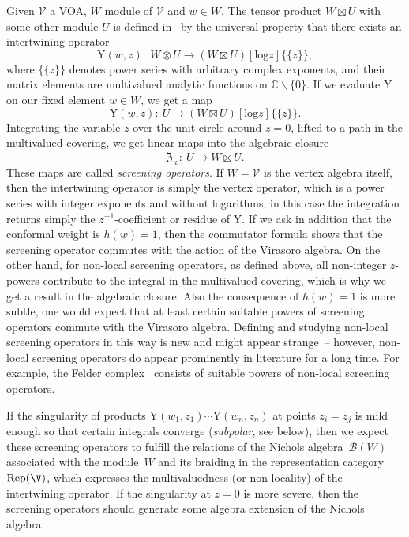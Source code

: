 \documentclass[10pt,a4paper]{amsart}
\numberwithin{equation}{section}
\newcommand{\C}{\mathbb{C}}
\newcommand{\Y}{\mathrm{Y}}
\newcommand{\cB}{\mathcal{B}}
\begin{document}
Given $\mathcal{V}$ a VOA, $W$ module of $\mathcal{V}$ and $w \in W$. The tensor product $W\boxtimes U$ with some other module $U$ is defined in~\cite{HLZ06} by the universal property that there exists an intertwining operator
\[\Y(w, z)\colon \ W\otimes U \rightarrow (W \boxtimes U)[\mathrm{log} z]\{\{z\}\},\]
where $\{\{z\}\}$ denotes power series with arbitrary complex exponents, and their matrix elements are multivalued analytic functions on $\C\backslash\{0\}$. If we evaluate $\Y$ on our fixed element $w\in W$, we get a map
\[\Y(w, z)\colon \ U \rightarrow (W \boxtimes U)[\mathrm{log} z]\{\{z\}\}.\]
	Integrating the variable $z$ over the unit circle around $z=0$, lifted to a path in the multivalued covering, we get linear maps into the algebraic closure
	\[\mathfrak{Z}_w \colon \  U \rightarrow \overline{W \boxtimes U}.\]
	These maps are called \emph{screening operators}. If $W=\mathcal{V}$ is the vertex algebra itself, then the intertwining operator is simply the vertex operator, which is a power series with integer exponents and without logarithms; in this case the integration returns simply the $z^{-1}$-coefficient or residue of $\Y$. If we ask in addition that the conformal weight is $h(w)=1$, then the commutator formula shows that the screening operator commutes with the action of the Virasoro algebra. On the other hand, for non-local screening operators, as defined above, all non-integer $z$-powers contribute to the integral in the multivalued covering, which is why we get a result in the algebraic closure. Also the consequence of $h(w)=1$ is more subtle, one would expect that at least certain suitable powers of screening operators commute with the Virasoro algebra. Defining and studying non-local screening operators in this way is new and might appear strange~-- however, non-local screening operators do appear prominently in literature for a long time. For example, the Felder complex~\cite{Fel89} consists of suitable powers of non-local screening operators.
	
If the singularity of products $\Y(w_1,z_1)\cdots \Y(w_n,z_n)$ at points $z_i=z_j$ is mild enough so that certain integrals converge (\emph{subpolar}, see below), then we expect these screening operators to fulfill the relations of the Nichols algebra~$\cB(W)$ associated with the module~$W$ and its braiding in the representation category $\operatorname{Rep}(\V)$, which expresses the multivaluedness (or non-locality) of the intertwining operator.
If the singularity at $z=0$ is more severe, then the screening operators should generate some algebra extension of the Nichols algebra.
\end{document}
